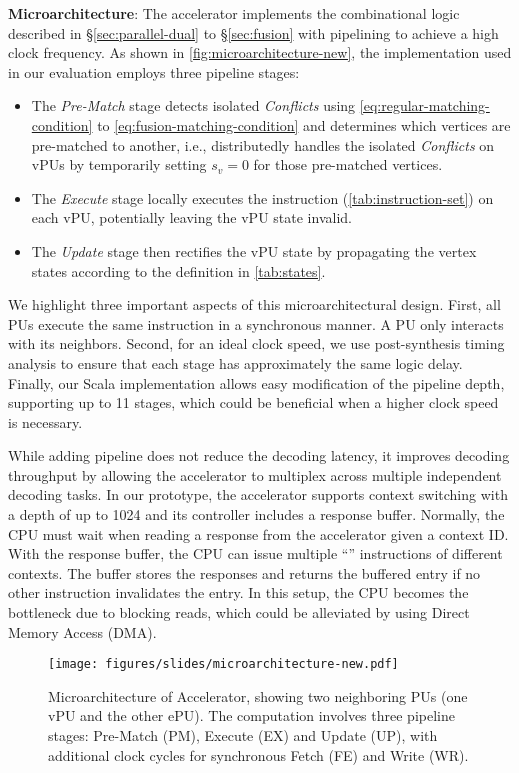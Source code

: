 \textbf{Microarchitecture}: The accelerator implements the combinational logic described in \S\ref{sec:parallel-dual} to \S\ref{sec:fusion} with pipelining to achieve a high clock frequency.
As shown in \autoref{fig:microarchitecture-new}, the implementation used in our evaluation employs three pipeline stages:
\begin{itemize}
    \item The \emph{Pre-Match} stage detects isolated \emph{Conflicts} using \autoref{eq:regular-matching-condition} to \autoref{eq:fusion-matching-condition} and determines which vertices are pre-matched to another, i.e., distributedly handles the isolated \emph{Conflicts} on vPUs by temporarily setting $s_v = 0$ for those pre-matched vertices.
    \item The \emph{Execute} stage locally executes the instruction (\autoref{tab:instruction-set}) on each vPU, potentially leaving the vPU state invalid.
    \item The \emph{Update} stage then rectifies the vPU state by propagating the vertex states according to the definition in \autoref{tab:states}.
\end{itemize}
We highlight three important aspects of this microarchitectural design.
First, all PUs execute the same instruction in a synchronous manner. A PU only interacts with its neighbors.
Second, for an ideal clock speed, we use post-synthesis timing analysis to ensure that each stage has approximately the same logic delay.
Finally, our Scala implementation allows easy modification of the pipeline depth, supporting up to 11 stages, which could be beneficial when a higher clock speed is necessary.

While adding pipeline does not reduce the decoding latency, it improves decoding throughput by allowing the accelerator to multiplex across multiple independent decoding tasks.
In our prototype, the accelerator supports context switching with a depth of up to 1024 and its controller includes a response buffer.
Normally, the CPU must wait when reading a response from the accelerator given a context ID.
With the response buffer, the CPU can issue multiple ``'' instructions of different contexts.
The buffer stores the responses and returns the buffered entry if no other instruction invalidates the entry.
In this setup, the CPU becomes the bottleneck due to blocking reads, which could be alleviated by using Direct Memory Access (DMA).

\begin{figure}
    \centering
    \texttt{[image: figures/slides/microarchitecture-new.pdf]}
    \caption{Microarchitecture of \system Accelerator, showing two neighboring PUs (one vPU and the other ePU). The computation involves three pipeline stages: Pre-Match (PM), Execute (EX) and Update (UP), with additional clock cycles for synchronous Fetch (FE) and Write (WR).}
    \label{fig:microarchitecture-new}
\end{figure}
